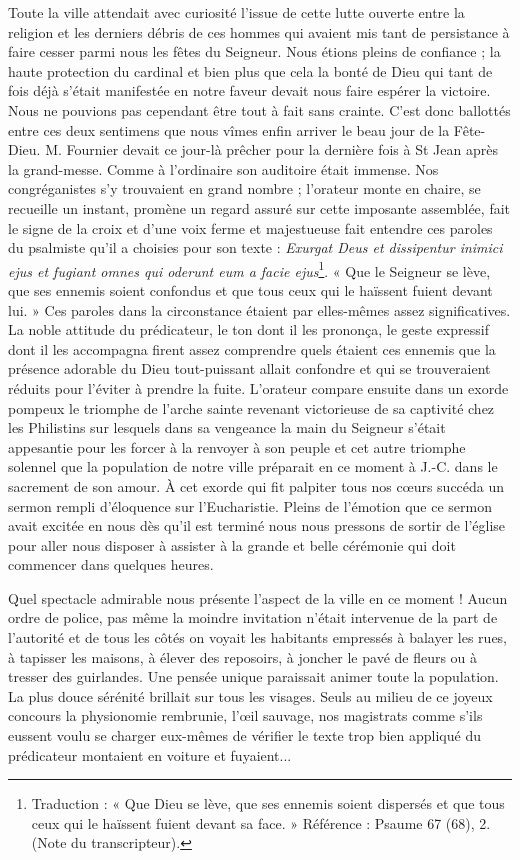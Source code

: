 Toute la ville attendait avec curiosité l'issue de cette lutte ouverte entre la religion et les derniers débris de ces hommes qui avaient mis tant de persistance à faire cesser parmi nous les fêtes du Seigneur. Nous étions pleins de confiance ; la haute protection du cardinal et bien plus que cela la bonté de Dieu qui tant de fois déjà s'était manifestée en notre faveur devait nous faire espérer la victoire. Nous ne pouvions pas cependant être tout à fait sans crainte. C'est donc ballottés entre ces deux sentimens que nous vîmes enfin arriver le beau jour de la Fête-Dieu. M. Fournier devait ce jour-là prêcher pour la dernière fois à St Jean après la grand-messe. Comme à l'ordinaire son auditoire était immense. Nos congréganistes s'y trouvaient en grand nombre ; l'orateur monte en chaire, se recueille un instant, promène un regard assuré sur cette imposante assemblée, fait le signe de la croix et d'une voix ferme et majestueuse fait entendre ces paroles du psalmiste qu'il
a choisies pour son texte : \textit{Exurgat Deus et dissipentur inimici ejus et fugiant omnes qui oderunt eum a facie ejus}\footnote{Traduction : « Que Dieu se lève, que ses ennemis soient dispersés et que tous ceux qui le haïssent fuient devant sa face. » Référence : Psaume 67 (68), 2. (Note du transcripteur).}. « Que le Seigneur se lève, que ses ennemis soient confondus et que tous ceux qui le haïssent fuient devant lui. » Ces paroles dans la circonstance étaient par elles-mêmes assez significatives. La noble attitude du prédicateur, le ton dont il les prononça, le geste expressif dont il les accompagna firent assez comprendre quels étaient ces ennemis que la présence adorable du Dieu tout-puissant allait confondre et qui se trouveraient réduits pour l'éviter à prendre la fuite. L'orateur compare ensuite dans un exorde pompeux le triomphe de l'arche sainte revenant victorieuse de sa captivité chez les Philistins sur lesquels dans sa vengeance la main du Seigneur s'était appesantie pour les forcer à la renvoyer à son peuple et cet autre triomphe solennel que la population de notre ville préparait en ce moment à J.-C. dans le sacrement de son amour. À cet exorde qui fit palpiter tous nos cœurs succéda un sermon rempli d'éloquence sur l'Eucharistie. Pleins de l'émotion que ce sermon avait excitée en nous dès qu'il est terminé nous nous pressons de sortir de l'église pour aller nous disposer à assister à la grande et belle cérémonie qui doit commencer dans quelques heures.

Quel spectacle admirable nous présente l'aspect de la ville en ce moment ! Aucun ordre de police, pas même la moindre invitation n'était intervenue de la part de l'autorité et de tous les côtés on voyait les habitants empressés à balayer les rues, à tapisser les maisons, à élever des reposoirs, à joncher le pavé de fleurs ou à tresser des guirlandes. Une pensée unique paraissait animer toute la population. La plus douce sérénité brillait sur tous les
visages. Seuls au milieu de ce joyeux concours la physionomie rembrunie, l'œil sauvage, nos magistrats comme s'ils eussent voulu se charger eux-mêmes de vérifier le texte trop bien appliqué du prédicateur montaient en voiture et fuyaient...

